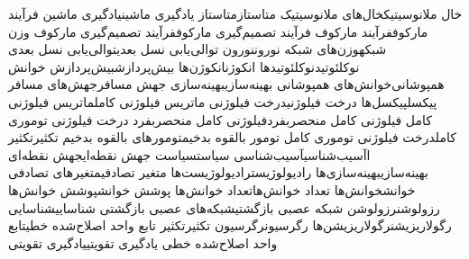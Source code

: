 {خال‌ ملانوسیتیک}{خال‌های ملانوسیتیک}
{متاستاز}{متاستاز}
{یادگیری ماشین}{یادگیری ماشین}
{فرآیند مارکوف}{فرآیند مارکوف}
{فرآیند تصمیم‌گیری مارکوف}{فرآیند تصمیم‌گیری مارکوف}
{وزن شبکه}{وزن‌های شبکه}
{نورون}{نورون}
{توالی‌یابی نسل بعدی}{توالی‌یابی نسل بعدی}
{نوکلئوتید}{نوکلئوتیدها}
{انکوژن}{انکوژن‌ها}
{بیش‌پردازش}{بیش‌پردازش}
{خوانش همپوشانی}{‌خوانش‌های همپوشانی}
{بهینه‌سازی}{بهینه‌‌سازی}
{جهش مسافر}{جهش‌های مسافر}
{پیکسل}{پیکسل‌ها}
{درخت فیلوژنی}{درخت فیلوژنی}
{ماتریس فیلوژنی کامل}{ماتریس فیلوژنی کامل}
{فیلوژنی کامل منحصربفرد}{فیلوژنی کامل منحصربفرد}
{درخت فیلوژنی توموری کامل}{درخت فیلوژنی توموری کامل}
{تومور بالقوه بدخیم}{تومورهای بالقوه بدخیم}
{تکثیر}{تکثیر}
{اآسیب‌شناسی}{آسیب‌شناسی}
{سیاست}{سیاست}
{جهش نقطه‌ای}{جهش نقطه‌ای}
{بهینه‌سازی}{بهینه‌سازی‌ها}
{رادیولوژیست}{رادیولوژیست‌ها}
{متغیر تصادفی}{متغیرهای تصادفی}
{خوانش}{خوانش‌ها}
{تعداد خوانش‌ها}{تعداد خوانش‌ها}
{پوشش خوانش}{پوشش خوانش‌ها}
{رزولوشن}{رزولوشن}
{شبکه‌ عصبی بازگشتی}{شبکه‌های عصبی بازگشتی}
{شناسایی}{شناسایی}
{رگولاریزیشن}{رگولاریزیشن‌ها}
{رگرسیون}{رگرسیون}
{تکثیر}{تکثیر}
{تابع واحد اصلاح‌شده خطی}{تابع واحد اصلاح‌شده خطی}
{یادگیری تقویتی}{یادگیری تقویتی}
